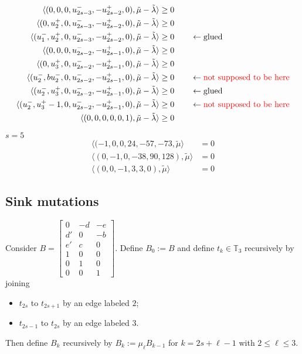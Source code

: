 \documentclass{amsart}
\numberwithin{theorem}{section}
\newcommand{\TT}{\mathbb{T}}
\begin{document}
  \begin{align*}
    \langle (0,0,0,u_{2s-3}^-,-u_{2s-2}^+,0), \tilde\mu - \tilde\lambda\rangle &\ge 0\\ 
    \langle (0,u_2^+,0,u_{2s-3}^-,-u_{2s-2}^+,0), \tilde\mu - \tilde\lambda\rangle &\ge 0\\ 
    \langle (u_1^-,u_2^+,0,u_{2s-3}^-,-u_{2s-2}^+,0), \tilde\mu - \tilde\lambda\rangle &\ge 0 \qquad \leftarrow \text{glued}\\ 
    \langle (0,0,0,u_{2s-2}^-,-u_{2s-1}^+,0), \tilde\mu - \tilde\lambda\rangle &\ge 0\\ 
    \langle (0,u_3^+,0,u_{2s-2}^-,-u_{2s-1}^+,0), \tilde\mu - \tilde\lambda\rangle &\ge 0\\ 
    \langle (u_2^-,bu_2^-,0,u_{2s-2}^-,-u_{2s-1}^+,0), \tilde\mu - \tilde\lambda\rangle &\ge 0 \qquad \leftarrow \text{\color{red}not supposed to be here}\\
    \langle (u_2^-,u_3^+,0,u_{2s-2}^-,-u_{2s-1}^+,0), \tilde\mu - \tilde\lambda\rangle &\ge 0 \qquad \leftarrow \text{glued}\\ 
    \langle (u_2^-,u_3^+ - 1,0,u_{2s-2}^-,-u_{2s-1}^+,0), \tilde\mu - \tilde\lambda\rangle &\ge 0 \qquad \leftarrow \text{\color{red}not supposed to be here}\\ 
    \langle (0,0,0,0,0,1), \tilde\mu - \tilde\lambda\rangle &\ge 0\\ 
  \end{align*}

  $s=5$
  \begin{align*}
    \langle (-1,0,0,24, -57, -73, \tilde\mu \rangle &= 0\\
    \langle (0,-1,0, -38, 90, 128), \tilde\mu \rangle &= 0\\
    \langle (0,0,-1, 3, 3, 0), \tilde\mu \rangle &= 0
  \end{align*}

  \subsection{Sink mutations}

  Consider $B=\left[\begin{array}{ccc} 0 & -d & -e \\ d' & 0 & -b\\ e' & c & 0\\ 1 & 0 & 0\\ 0 & 1 & 0\\ 0 & 0 & 1\end{array}\right]$.
  Define $B_0:=B$ and define $t_k\in\TT_3$ recursively by joining 
  \begin{itemize}
    \item $t_{2s}$ to $t_{2s+1}$ by an edge labeled $2$;
    \item $t_{2s-1}$ to $t_{2s}$ by an edge labeled $3$.
  \end{itemize}
  Then define $B_k$ recursively by $B_k:=\mu_\ell B_{k-1}$ for $k=2s+\ell-1$ with $2\le\ell\le 3$.
\end{document}
